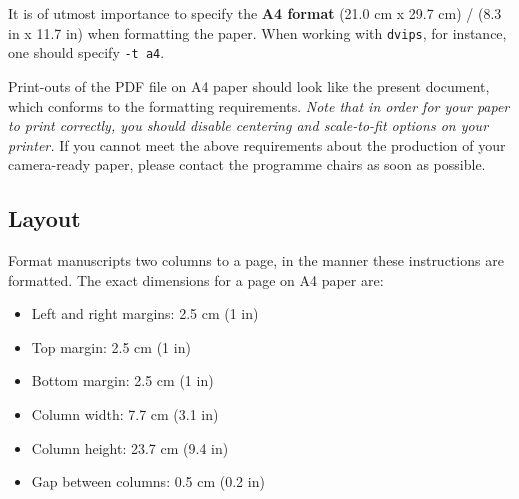 \documentclass[11pt]{article}
\begin{document}

It is of utmost importance to specify the \textbf{A4 format} (21.0 cm
x 29.7 cm) / (8.3 in x 11.7 in) when formatting the paper. When working with
{\tt dvips}, for instance, one should specify {\tt -t a4}.

Print-outs of the PDF file on A4 paper should look like the present document,
which conforms to the formatting requirements. {\em Note that in order for
your paper to print correctly, you should disable centering and scale-to-fit
options on your printer.} If you cannot meet the above requirements about the
production of your camera-ready paper, please contact the programme chairs
as soon as possible.


\subsection{Layout}
\label{ssec:layout}

Format manuscripts two columns to a page, in the manner these
instructions are formatted. The exact dimensions for a page on
A4 paper are:


\begin{itemize}
\itemsep 0mm
\item Left and right margins: 2.5 cm (1 in)
\item Top margin: 2.5 cm (1 in)
\item Bottom margin: 2.5 cm (1 in)
\item Column width: 7.7 cm (3.1 in)
\item Column height: 23.7 cm (9.4 in)
\item Gap between columns: 0.5 cm (0.2 in)
\end{itemize}
\end{document}
